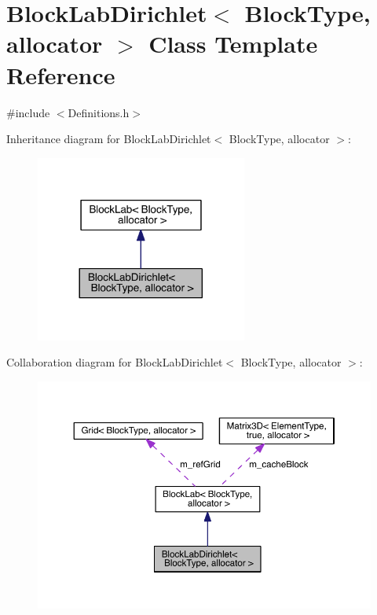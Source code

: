 \hypertarget{class_block_lab_dirichlet}{}\section{Block\+Lab\+Dirichlet$<$ Block\+Type, allocator $>$ Class Template Reference}
\label{class_block_lab_dirichlet}


{\ttfamily \#include $<$Definitions.\+h$>$}



Inheritance diagram for Block\+Lab\+Dirichlet$<$ Block\+Type, allocator $>$\+:\nopagebreak
\begin{figure}[H]
\begin{center}
\leavevmode
\includegraphics[width=197pt]{d6/d91/class_block_lab_dirichlet__inherit__graph}
\end{center}
\end{figure}


Collaboration diagram for Block\+Lab\+Dirichlet$<$ Block\+Type, allocator $>$\+:\nopagebreak
\begin{figure}[H]
\begin{center}
\leavevmode
\includegraphics[width=350pt]{dc/dfc/class_block_lab_dirichlet__coll__graph}
\end{center}
\end{figure}
